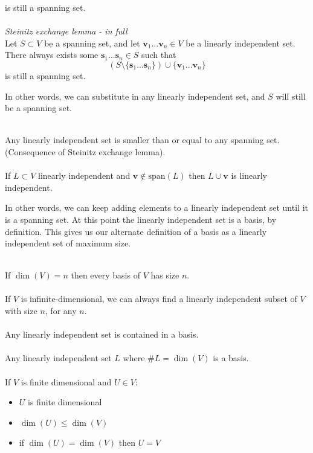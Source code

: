 \documentclass{scrartcl}
\renewcommand{\vec}[1]{\mathbf{#1}}
\begin{document}
is still a spanning set.
\\\\
\textit{Steinitz exchange lemma - in full}
\\
Let $ S \subset V $ be a spanning set, and let $ \vec{v}_{1}...\vec{v}_{n} \in V $ be a linearly independent set. There always exists some $ \vec{s}_{1}...\vec{s}_{n} \in S $ such that
\begin{equation}
(S \setminus \{\vec{s}_{1}...\vec{s}_{n}\}) \cup \{\vec{v}_{1}...\vec{v}_{n}\}
\end{equation}
is still a spanning set.
\\
\begin{tcolorbox}[breakable]
In other words, we can substitute in any linearly independent set, and $ S $ will still be a spanning set.
\end{tcolorbox}
\noindent
\\
Any linearly independent set is smaller than or equal to any spanning set. (Consequence of Steinitz exchange lemma).
\\\\
If $ L \subset V $ linearly independent and $ \vec{v} \notin \textrm{span}(L) $ then $ L \cup {\vec{v}} $ is linearly independent.
\\
\begin{tcolorbox}[breakable]
In other words, we can keep adding elements to a linearly independent set until it is a spanning set. At this point the linearly independent set is a basis, by definition. This gives us our alternate definition of a basis as a linearly independent set of maximum size.
\end{tcolorbox}
\noindent
\\
If $ \dim(V) = n $ then every basis of $ V $ has size $ n $.
\\\\
If $ V $ is infinite-dimensional, we can always find a linearly independent subset of $ V $ with size $ n $, for any $ n $.
\\\\
Any linearly independent set is contained in a basis.
\\\\
Any linearly independent set $ L $ where $ \#L = \dim(V) $ is a basis.
\\\\
If $ V $ is finite dimensional and $ U \in V $:
\begin{itemize}
\item $ U $ is finite dimensional
\item $ \dim(U) \leq \dim(V) $
\item if $ \dim(U) = \dim(V) $ then $ U = V $
\end{itemize}
\end{document}
